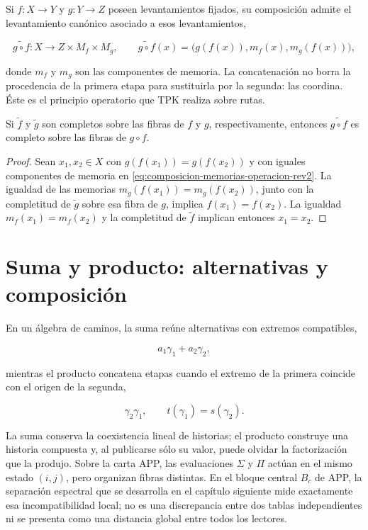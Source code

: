 Si \(f:X\to Y\) y \(g:Y\to Z\) poseen levantamientos fijados, su composición
admite el levantamiento canónico asociado a esos levantamientos,

\begin{equation}
 \widetilde{g\circ f}:X\longrightarrow Z\times M_f\times M_g,
 \qquad
 \widetilde{g\circ f}(x)
 =\bigl(g(f(x)),m_f(x),m_g(f(x))\bigr),
 \label{eq:composicion-memorias-operacion-rev2}
\end{equation}

donde \(m_f\) y \(m_g\) son las componentes de memoria. La concatenación no
borra la procedencia de la primera etapa para sustituirla por la segunda: las
coordina. Éste es el principio operatorio que TPK realiza sobre rutas.

\begin{lemma}
\label{lem:composicion-levantamientos-completos-rev2}
Si \(\widetilde f\) y \(\widetilde g\) son completos sobre las fibras de
\(f\) y \(g\), respectivamente, entonces
\(\widetilde{g\circ f}\) es completo sobre las fibras de \(g\circ f\).
\end{lemma}

\begin{proof}
Sean \(x_1,x_2\in X\) con
\(g(f(x_1))=g(f(x_2))\) y con iguales componentes de memoria en
\eqref{eq:composicion-memorias-operacion-rev2}. La igualdad de las memorias
\(m_g(f(x_1))=m_g(f(x_2))\), junto con la completitud de
\(\widetilde g\) sobre esa fibra de \(g\), implica
\(f(x_1)=f(x_2)\). La igualdad
\(m_f(x_1)=m_f(x_2)\) y la completitud de \(\widetilde f\) implican entonces
\(x_1=x_2\).
\end{proof}

\section{Suma y producto: alternativas y composición}

En un álgebra de caminos, la suma reúne alternativas con extremos
compatibles,

\[
 a_1\gamma_1+a_2\gamma_2,
\]

mientras el producto concatena etapas cuando el extremo de la primera
coincide con el origen de la segunda,

\[
 \gamma_2\gamma_1,
 \qquad t(\gamma_1)=s(\gamma_2).
\]

La suma conserva la coexistencia lineal de historias; el producto construye
una historia compuesta y, al publicarse sólo su valor, puede olvidar la
factorización que la produjo. Sobre la carta APP, las evaluaciones
\(\Sigma\) y \(\Pi\) actúan en el mismo estado \((i,j)\), pero organizan fibras
distintas. En el bloque central \(B_c\) de APP, la separación espectral que
se desarrolla en el capítulo siguiente mide exactamente esa incompatibilidad
local; no es una discrepancia entre dos tablas independientes ni se presenta
como una distancia global entre todos los lectores.

